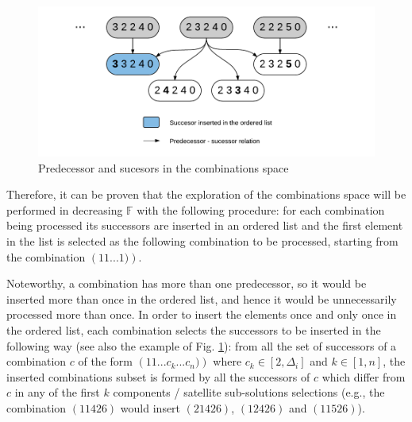\begin{figure}[h!]
\centering
\includegraphics[scale=0.7]{Figures/succ.png} 
\caption{Predecessor and sucesors in the combinations space}
\label{fig_succ}
\end{figure}

Therefore, it can be proven that the exploration of the combinations space will be performed in decreasing $\mathbb{F}$ with the following procedure: for each combination being processed its successors are inserted in an ordered list and the first element in the list is selected as the following combination to be processed, starting from the combination $\left(1 1 ... 1)\right)$.

Noteworthy, a combination has more than one predecessor, so it would be inserted more than once in the ordered list, and hence it would be unnecessarily processed more than once. In order to insert the elements once and only once in the ordered list, each combination selects the successors to be inserted in the following way (see also the example of Fig. \ref{fig_succ}): from all the set of successors of a combination $c$ of the form $\left(1 1 ... c_k ... c_n)\right)$ where $c_k \in [2, \Delta_i]$ and $k \in [1,n]$, the inserted combinations subset is formed by all the successors of $c$ which differ from $c$ in any of the first $k$ components / satellite sub-solutions selections (e.g., the combination $(1 1 4 2 6)$ would insert $(2 1 4 2 6)$, $(1 2 4 2 6)$ and $(1 1 5 2 6)$).